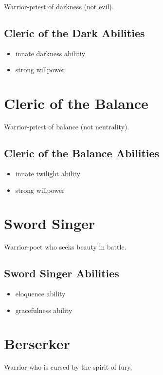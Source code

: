 \begin{multicols}{2}
Warrior-priest of darkness (not evil).

\subsection{Cleric of the Dark Abilities}

\begin{itemize}
    \item innate darkness abilitiy
    \item strong willpower
\end{itemize}

\section{Cleric of the Balance}

Warrior-priest of balance (not neutrality).

\subsection{Cleric of the Balance Abilities}

\begin{itemize}
    \item innate twilight ability
    \item strong willpower
\end{itemize}

\section{Sword Singer}

Warrior-poet who seeks beauty in battle.

\subsection{Sword Singer Abilities}

\begin{itemize}
    \item eloquence ability
    \item gracefulness ability
\end{itemize}

\section{Berserker}

Warrior who is cursed by the spirit of fury.


\end{multicols}
